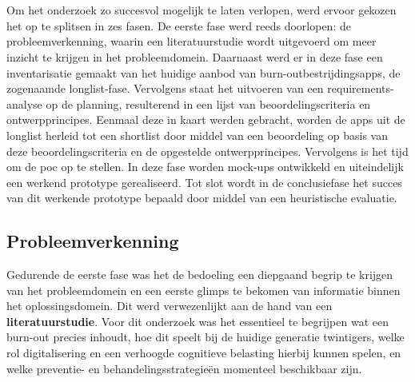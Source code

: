 
\chapter{}%
\label{ch:methodologie}

Om het onderzoek zo succesvol mogelijk te laten verlopen, werd ervoor gekozen het op te splitsen in zes fasen. De eerste fase werd reeds doorlopen: de probleemverkenning, waarin een literatuurstudie wordt uitgevoerd om meer inzicht te krijgen in het probleemdomein. Daarnaast werd er in deze fase een inventarisatie gemaakt van het huidige aanbod van burn-outbestrijdingsapps, de zogenaamde longlist-fase. Vervolgens staat het uitvoeren van een requirements-analyse op de planning, resulterend in een lijst van beoordelingscriteria en ontwerpprincipes. Eenmaal deze in kaart werden gebracht, worden de apps uit de longlist herleid tot een shortlist door middel van een beoordeling op basis van deze beoordelingscriteria en de opgestelde ontwerpprincipes. Vervolgens is het tijd om de \acrlong{poc} op te stellen. In deze fase worden mock-ups ontwikkeld en uiteindelijk een werkend prototype gerealiseerd. Tot slot wordt in de conclusiefase het succes van dit werkende prototype bepaald door middel van een heuristische evaluatie.



\section{Probleemverkenning}
\label{sec:probleemverkenning}

\vspace{1em}

Gedurende de eerste fase was het de bedoeling een diepgaand begrip te krijgen van het probleemdomein en een eerste glimps te bekomen van informatie binnen het oplossingsdomein. Dit werd verwezenlijkt aan de hand van een \textbf{literatuurstudie}. Voor dit onderzoek was het essentieel te begrijpen wat een burn-out precies inhoudt, hoe dit speelt bij de huidige generatie twintigers, welke rol digitalisering en een verhoogde cognitieve belasting hierbij kunnen spelen, en welke preventie- en behandelingsstrategieën momenteel beschikbaar zijn. 

\vspace{1em}

